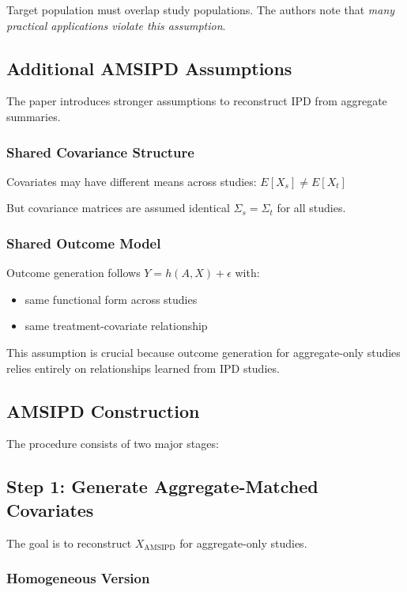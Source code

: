 \documentclass[11pt]{article}
\begin{document}
Target population must overlap study populations. The authors note that \emph{many practical applications violate this assumption}.

\subsection*{Additional AMSIPD Assumptions}

The paper introduces stronger assumptions to reconstruct IPD from aggregate summaries.

\subsubsection*{Shared Covariance Structure}

Covariates may have different means across studies: $ E[X_s]\neq E[X_t]$

But covariance matrices are assumed identical $ \Sigma_s=\Sigma_t$ for all studies.

\subsubsection*{Shared Outcome Model}

Outcome generation follows $Y = h(A,X)+\epsilon$ with:
\begin{itemize}
    \item same functional form across studies
    \item same treatment-covariate relationship
\end{itemize}
This assumption is crucial because outcome generation for aggregate-only studies relies entirely on relationships learned from IPD studies.

\subsection*{AMSIPD Construction}

The procedure consists of two major stages:

\subsection*{Step 1: Generate Aggregate-Matched Covariates}

The goal is to reconstruct $X_{\text{AMSIPD}}$ for aggregate-only studies.

\subsubsection*{Homogeneous Version}
\end{document}
